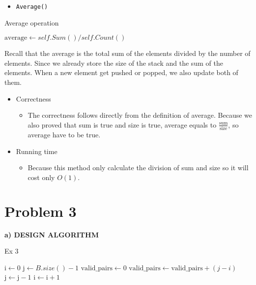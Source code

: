 \documentclass{article}
\begin{document}
	\begin{itemize}
		\item \verb|Average()|
	\end{itemize}


	\begin{algorithm}[H]
		\caption{Average operation}
		\label{Average}
	\begin{algorithmic}[1]
		\State \(\text{average} \gets self.Sum()/self.Count()\)
		\State {}
		\EndFunction{}
	\end{algorithmic}		
	\end{algorithm}


	Recall that the average is the total sum of the elements divided by the number
	of elements. Since we already store the size of the stack and the sum of the elements. When a new
	element get pushed or popped, we also update both of them.


	\begin{itemize}
		\item Correctness
		\begin{itemize}
			\item The correctness follows directly from the definition of average. Because we also proved that sum is true and size is true, average equals to \(\frac{\text{sum}}{\text{size}}\), so average have to be true.
		\end{itemize}
		\item Running time
		\begin{itemize}
			\item Because this method only calculate the division of sum and size so it will cost only \(O(1)\).
		\end{itemize}
	\end{itemize}


	\newpage\section*{Problem 3}
	\textbf{a) DESIGN ALGORITHM}
	\begin{algorithm}[H]
		\caption{Ex 3}
	\begin{algorithmic}[1]
		\State \(\text{i} \gets 0\)
		\State \(\text{j} \gets B.size() - 1\)
		\State \(\text{valid\_pairs} \gets 0\)
				\State \(\text{valid\_pairs} \gets \text{valid\_pairs} + (j - i)\)
				\State \(\text{j} \gets \text{j} - 1\)
				\Else{}
				\State \(\text{i} \gets \text{i} + 1\)
				\EndIf{}
			\EndFor{}
		\State {}
		\EndFunction{}
	\end{algorithmic}		
	\end{algorithm}
\end{document}
